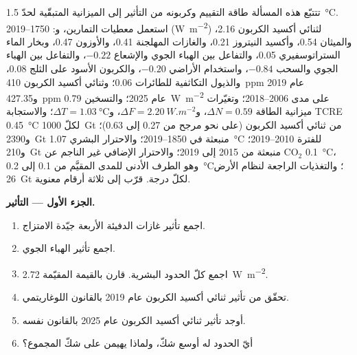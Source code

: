 \begin{problem}\label{pb:b2:anthropogenic-climate-change:1}
تتتبّع هذه المسألة طاقة التقييم وكربونه من التأثير إلى الميزانية
المتبقّية لحدّ \qty{1.5}{\celsius}. استعمل معطيات التمارين، و:  1750--2019 (\unit{W.m^{-2}})
لثنائي أكسيد الكربون 2.16، والميثان 0.54، وأكسيد النيتروز 0.21، والغازات المهلجنة 0.41، والأوزون 0.47،
وبخار الماء الستراتوسفيري 0.05، والتفاعل بين الهباء الجوي والإشعاع $-0.22$، والتفاعل بين الهباء الجوي والسحب $-0.84$، واستخدام الأراضي
$-0.20$، والكربون الأسود على الثلج 0.08، والذيول التكاثفية للطائرات 0.06؛ وثنائي أكسيد الكربون \qty{410}{ppm} عام 2019
و\qty{427.35}{ppm} عام 2025؛ والتسخين \qty{0.79}{W.m^{-2}} على مدى 2006--2018؛ وتغيّرات ميزانية الطاقة
$\Delta N = 0.59$، و$\Delta F = \qty{2.20}{W.m^{-2}}$، و$\Delta T = \qty{1.03}{\celsius}$؛ والاستجابة TCRE
\qty{0.45}{\celsius} لكلّ \qty{1000}{Gt} من ثنائي أكسيد الكربون (على نحو مرجح من 0.27 إلى 0.63)؛ و\qty{2390}{Gt}
منبعثة في 1850--2019؛ والاحترار البشري \qty{1.07}{\celsius} للفترة 2010--2019؛ و\qty{210}{Gt} منبعثة من
2015 إلى 2019؛ والاحترار الإضافي غير الناجم عن CO$_2$ \qty{0.1}{\celsius}، وهو الطرف الأدنى للمدى المقيَّم من 0.1
إلى \qty{0.2}{\celsius}؛ والتغذيات الراجعة لنظام الأرض \qty{26}{Gt} لكلّ درجة. قرّب إلى ثلاثة أرقام
معنوية.

\noindent\textbf{الجزء الأول --- التأثير.}
\begin{enumerate}
  \item اجمع تأثير غازات الدفيئة الأربعة جيّدة الامتزاج.
  \item اجمع تأثير الهباء الجوي.
  \item اجمع كلّ الحدود البشرية. قارن بالقيمة المقيّمة \qty{2.72}{W.m^{-2}}.
  \item تحقّق من تأثير ثنائي أكسيد الكربون عام 2019 بالقانون اللوغاريتمي.
  \item أوجد تأثير ثنائي أكسيد الكربون عام 2025 بالقانون نفسه.
  \item أيّ الحدود له أوسع شكّ، ولماذا يهيمن على شكّ المجموع؟
\end{enumerate}


\end{problem}

